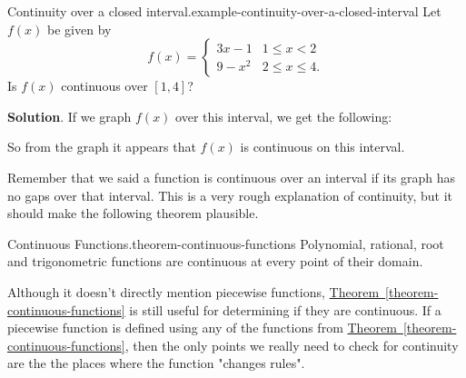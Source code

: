 \documentclass[10pt,]{book}
\numberwithin{equation}{section}
\begin{document}
\begin{example}{Continuity over a closed interval.}{example-continuity-over-a-closed-interval}%
\hypertarget{p-37}{}%
Let \(f(x)\) be given by%
\begin{equation*}
f(x) = \begin{cases} 3x-1 & 1\leq x< 2 \\ 9-x^{2} & 2\leq x\leq 4.\end{cases}
\end{equation*}
Is \(f(x)\) continuous over \([1,4]\)?%
\par\smallskip%
\noindent\textbf{Solution}.\hypertarget{solution-7}{}\quad%
\hypertarget{p-38}{}%
If we graph \(f(x)\) over this interval, we get the following:%
\begin{figure}
\centering
{
}
\end{figure}
\hypertarget{p-39}{}%
So from the graph it appears that \(f(x)\) is continuous on this interval.%
\end{example}
\hypertarget{p-40}{}%
Remember that we said a function is continuous over an interval if its graph has no gaps over that interval. This is a very rough explanation of continuity, but it should make the following theorem plausible.%
\begin{theorem}{Continuous Functions.}{}{theorem-continuous-functions}%
\hypertarget{p-41}{}%
Polynomial, rational, root and trigonometric functions are continuous at every point of their domain.%
\end{theorem}
\hypertarget{p-42}{}%
Although it doesn't directly mention piecewise functions, \hyperref[theorem-continuous-functions]{Theorem~\ref{theorem-continuous-functions}} is still useful for determining if they are continuous. If a piecewise function is defined using any of the functions from \hyperref[theorem-continuous-functions]{Theorem~\ref{theorem-continuous-functions}}, then the only points we really need to check for continuity are the the places where the function "changes rules".%
\end{document}
